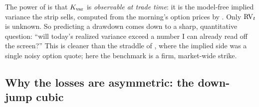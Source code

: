 \begin{keyidea}
The power of  is that $K_{\mathrm{var}}$ is \emph{observable at trade time}: it is the model-free implied variance the strip sells, computed from the morning's option prices by . Only $\operatorname{RV}_t$ is unknown. So predicting a drawdown comes down to a sharp, quantitative question: ``will today's realized variance exceed a number I can already read off the screen?'' This is cleaner than the straddle of , where the implied side was a single noisy option quote; here the benchmark is a firm, market-wide strike.
\end{keyidea}

\subsection*{Why the losses are asymmetric: the down-jump cubic}

